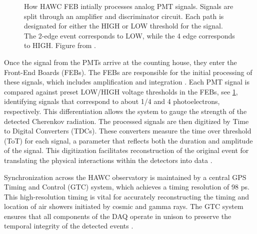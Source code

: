 \begin{figure}
    \caption{How HAWC FEB intially processes analog PMT signals. Signals are split through an amplifier and discriminator circuit. Each path is designated for either the HIGH or LOW threshold for the signal. The 2-edge event corresponds to LOW, while the 4 edge corresponds to HIGH. Figure from \cite{HAWC_DAQ_NIM}.}
    \label{fig:tot_threholds}
\end{figure}

Once the signal from the PMTs arrive at the counting house, they enter the Front-End Boards (FEBs).
The FEBs are responsible for the initial processing of these signals, which includes amplification and integration \cite{Milagro_DAQ}.
Each PMT signal is compared against preset LOW/HIGH voltage thresholds in the FEBs, see \cref{fig:tot_threholds}, identifying signals that correspond to about 1/4 and 4 photoelectrons, respectively.
This differentiation allows the system to gauge the strength of the detected Cherenkov radiation.
The processed signals are then digitized by Time to Digital Converters (TDCs).
These converters measure the time over threshold (ToT) for each signal, a parameter that reflects both the duration and amplitude of the signal.
This digitization facilitates reconstruction of the original event for translating the physical interactions within the detectors into data \cite{HAWC_NIM,HAWC_DAQ_NIM,Milagro_DAQ}.

Synchronization across the HAWC observatory is maintained by a central GPS Timing and Control (GTC) system, which achieves a timing resolution of 98 ps.
This high-resolution timing is vital for accurately reconstructing the timing and location of air showers initiated by cosmic and gamma rays.
The GTC system ensures that all components of the DAQ operate in unison to preserve the temporal integrity of the detected events \cite{HAWC_NIM,hawc_daq_thesis}.

